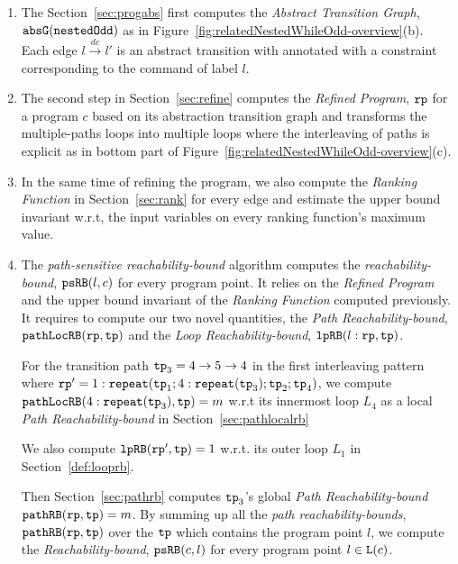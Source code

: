 \begin{enumerate}
    \item  The Section~\ref{sec:progabs} first 
    computes the \emph{Abstract Transition Graph}, $\mathtt{abs}{\mathtt{G}}(\mathtt{nestedOdd})$ as in Figure~\ref{fig:relatedNestedWhileOdd-overview}(b).
    Each edge $l \xrightarrow{dc} l'$ is an abstract transition with annotated with a constraint corresponding to the command of label $l$.
    \item The second step in Section~\ref{sec:refine}
    computes the \emph{Refined Program}, $\mathtt{rp}$ for a program $c$ based on 
    its abstraction transition graph and transforms the multiple-paths loops
    into multiple loops where
    the interleaving of paths is explicit as in bottom part of Figure~\ref{fig:relatedNestedWhileOdd-overview}(c).
    \item In the same time of refining the program, we also compute the \emph{Ranking Function} in Section~\ref{sec:rank}
    for every edge 
    and estimate the upper bound invariant w.r.t, the input variables on every ranking function's maximum value.
    \item The \emph{path-sensitive reachability-bound} algorithm computes the \emph{reachability-bound}, $\mathtt{psRB}(l, c)$ for every program point.
    It relies on the \emph{Refined Program} and the upper bound invariant of the \emph{Ranking Function} computed previously.
    It requires to compute our two novel quantities, the \emph{Path Reachability-bound}, $\mathtt{pathLocRB}(\mathtt{rp}, \mathtt{tp})$ and the \emph{Loop Reachability-bound}, $\mathtt{lpRB}(l: \mathtt{rp}, \mathtt{tp})$.

    For the transition path $\mathtt{tp}_3 = 4 \to 5 \to 4$ in the first interleaving pattern where $\mathtt{rp}' = 1: \mathtt{repeat}(\mathtt{tp}_1; 4:\mathtt{repeat}(\mathtt{tp}_3); \mathtt{tp}_2; \mathtt{tp}_4)$,
    we compute $\mathtt{pathLocRB}(4:\mathtt{repeat}(\mathtt{tp}_3), \mathtt{tp}) = m$ w.r.t its innermost loop $L_4$ as a local \emph{Path Reachability-bound} in Section~\ref{sec:pathlocalrb}
    
    We also compute $\mathtt{lpRB}(\mathtt{rp}', \mathtt{tp}) = 1$ w.r.t. its outer loop $L_1$ in Section~\ref{def:looprb}.

    Then Section~\ref{sec:pathrb} computes $\mathtt{tp}_3$'s global \emph{Path Reachability-bound} $\mathtt{pathRB}(\mathtt{rp}, \mathtt{tp}) = m$.
    By summing up all the \emph{path reachability-bounds}, $\mathtt{pathRB}(\mathtt{rp}, \mathtt{tp})$ over the $\mathtt{tp}$ which contains the program point $l$, we compute the \emph{Reachability-bound}, $\mathtt{psRB}(c, l)$ for every program point $l \in \mathtt{L}(c)$.
    

\end{enumerate}
